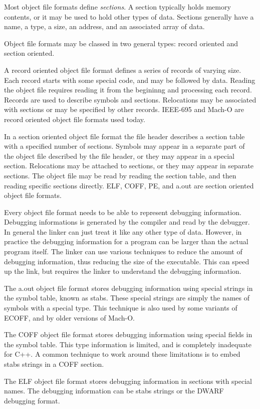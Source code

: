 Most object file formats define \emph{sections}. A section typically
holds memory contents, or it may be used to hold other types of data.
Sections generally have a name, a type, a size, an address, and an
associated array of data.

Object file formats may be classed in two general types: record oriented
and section oriented.

A record oriented object file format defines a series of records of
varying size. Each record starts with some special code, and may be
followed by data. Reading the object file requires reading it from the
begininng and processing each record. Records are used to describe
symbols and sections. Relocations may be associated with sections or may
be specified by other records. IEEE-695 and Mach-O are record oriented
object file formats used today.

In a section oriented object file format the file header describes a
section table with a specified number of sections. Symbols may appear
in a separate part of the object file described by the file header, or
they may appear in a special section. Relocations may be attached to
sections, or they may appear in separate sections. The object file may
be read by reading the section table, and then reading specific sections
directly. ELF, COFF, PE, and a.out are section oriented object file
formats.

Every object file format needs to be able to represent debugging
information. Debugging informations is generated by the compiler and
read by the debugger. In general the linker can just treat it like any
other type of data. However, in practice the debugging information for a
program can be larger than the actual program itself. The linker can use
various techniques to reduce the amount of debugging information, thus
reducing the size of the executable. This can speed up the link, but
requires the linker to understand the debugging information.

The a.out object file format stores debugging information using special
strings in the symbol table, known as stabs. These special strings are
simply the names of symbols with a special type. This technique is also
used by some variants of ECOFF, and by older versions of Mach-O.

The COFF object file format stores debugging information using special
fields in the symbol table. This type information is limited, and is
completely inadequate for C++. A common technique to work around these
limitations is to embed stabs strings in a COFF section.

The ELF object file format stores debugging information in sections with
special names. The debugging information can be stabs strings or the
DWARF debugging format.
